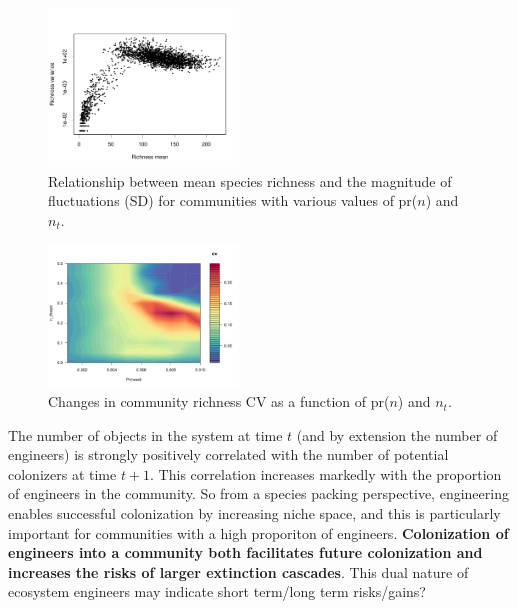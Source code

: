 \documentclass[twocolumn,preprintnumbers,amsmath,amssymb,superscriptaddress]{revtex4-1}
\begin{document}
\begin{figure}
\centering
\includegraphics[width=0.45\textwidth]{fig_taylors.pdf}
\caption{
Relationship between mean species richness and the magnitude of fluctuations (SD) for communities with various values of pr($n$) and $n_t$.
}
\label{fig_traj}
\end{figure} 


\begin{figure}
\centering
\includegraphics[width=0.45\textwidth]{fig_sen_nn.pdf}
\caption{Changes in community richness CV as a function of pr($n$) and $n_t$. 
}
\label{fig_sen_nn}
\end{figure} 




The number of objects in the system at time $t$ (and by extension the number of engineers) is strongly positively correlated with the number of potential colonizers at time $t+1$.
This correlation increases markedly with the proportion of engineers in the community.
So from a species packing perspective, engineering enables successful colonization by increasing niche space, and this is particularly important for communities with a high proporiton of engineers.
{\bf Colonization of engineers into a community both facilitates future colonization and increases the risks of larger extinction cascades}.
This dual nature of ecosystem engineers may indicate short term/long term risks/gains?
\end{document}
